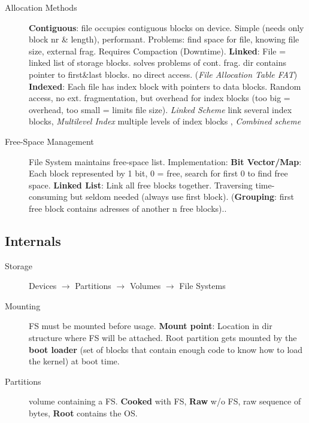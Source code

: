 \begin{description}
    \item[Allocation Methods] \textbf{Contiguous}: file occupies contiguous blocks on device. Simple (needs only block nr \& length), performant. Problems: find space for file, knowing file size, external frag. Requires Compaction (Downtime). %
        \textbf{Linked}: File = linked list of storage blocks. solves problems of cont. frag. dir contains pointer to first\&last blocks. no direct access. (\textit{File Allocation Table FAT}) %
        \textbf{Indexed}: Each file has index block with pointers to data blocks. Random access, no ext. fragmentation, but overhead for index blocks (too big = overhead, too small = limits file size). \textit{Linked Scheme} link several index blocks, \textit{Multilevel Index} multiple levels of index blocks , \textit{Combined scheme}
    \item[Free-Space Management] File System maintains free-space list. Implementation: \textbf{Bit Vector/Map}: Each block represented by 1 bit, 0 = free, search for first 0 to find free space. \textbf{Linked List}: Link all free blocks together. Traversing time-consuming but seldom needed (always use first block). (\textbf{Grouping}: first free block contains adresses of another n free blocks)..
\end{description}

\subsection*{Internals}
\begin{description}
    \item[Storage] Devices $\rightarrow$ Partitions $\rightarrow$ Volumes $\rightarrow$ File Systems
    \item[Mounting] FS must be mounted before usage. \textbf{Mount point}: Location in dir structure where FS will be attached. Root partition gets mounted by the \textbf{boot loader} (set of blocks that contain enough code to know how to load the kernel) at boot time.
    \item[Partitions] volume containing a FS. \textbf{Cooked} with FS, \textbf{Raw} w/o FS, raw sequence of bytes, \textbf{Root} contains the OS.
\end{description}
